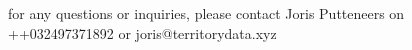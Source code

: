 for any questions or inquiries, please contact Joris Putteneers on ++032497371892 or joris@territorydata.xyz